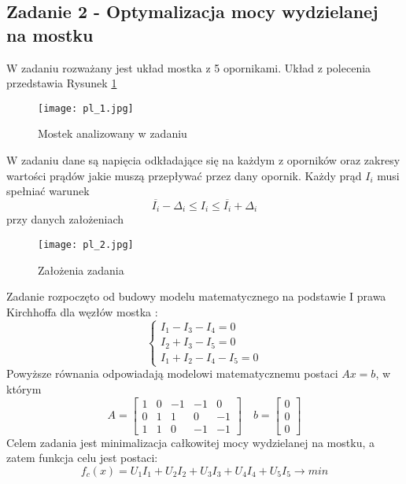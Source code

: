 \documentclass[a4paper,15pt]{article}
\begin{document}
\subsection{Zadanie 2 - Optymalizacja mocy wydzielanej na mostku }
W zadaniu rozważany jest układ mostka z 5 opornikami. Układ z polecenia przedstawia Rysunek  \ref{fig:pl_1}
\begin{figure}[H]
\centerline{\texttt{[image: pl\_1.jpg]}}
\centering
\caption{Mostek analizowany w zadaniu}
\label{fig:pl_1}
\end{figure}
W zadaniu dane są napięcia odkładające się na każdym z oporników oraz zakresy wartości prądów jakie muszą przepływać przez dany opornik. 
Każdy prąd \( I_{i} \) musi spełniać warunek 
\begin{equation*}
\overline{I_{i}}-\Delta_{i} \leq I_{i} \leq \overline{I_{i}}+\Delta_{i}
\end{equation*}  
przy danych założeniach 
\begin{figure}[H]
\centerline{\texttt{[image: pl\_2.jpg]}}
\centering
\caption{Założenia zadania}
\label{fig:pl_2}
\end{figure}
\newpage
Zadanie rozpoczęto od budowy modelu matematycznego na podstawie I prawa Kirchhoffa dla węzłów mostka :
\begin{equation*}
\begin{cases}
I_{1}-I_{3}-I_{4}=0 \\
I_{2}+I_{3}-I_{5}=0 \\
I_{1}+I_{2}-I_{4}-I_{5}=0
\end{cases}
\end{equation*}
Powyższe równania odpowiadają modelowi matematycznemu postaci \( Ax = b \), w którym 
\begin{equation*}
A=
\begin{bmatrix} 
1 & 0 & -1 & -1 & 0 \\ 
0 & 1 & 1 & 0 & -1 \\
1 & 1 & 0 & -1 & -1  
\end{bmatrix}
\quad 
b=
\begin{bmatrix} 
0 \\ 
0 \\
0
\end{bmatrix}
\end{equation*}
Celem zadania jest minimalizacja całkowitej mocy wydzielanej na mostku, a zatem funkcja celu jest postaci: 
\begin{equation*}
f_{c}(x)=U_{1}I_{1}+U_{2}I_{2}+U_{3}I_{3}+U_{4}I_{4}+U_{5}I_{5} \rightarrow min
\end{equation*}
\end{document}
